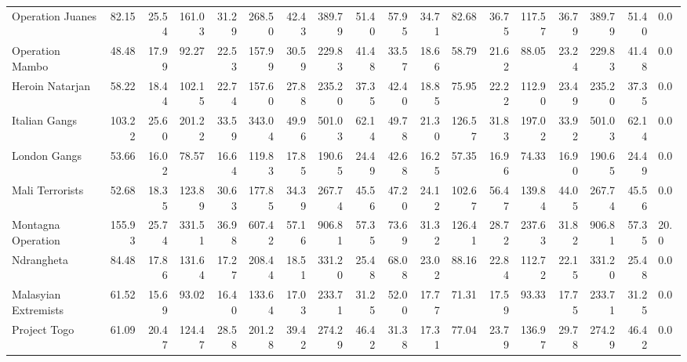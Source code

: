 \begin{tabular}{lrrrrrrrrrrrrrrrrl}
Operation Juanes     &             82.15 &  25.54 &  161.03 &  31.29 &  268.50 &  42.43 &  389.79 &  51.40 &            57.95 &   34.71 &   82.68 &   36.75 &  117.57 &   36.79 &  389.79 &  51.40 &        0.0 \\
Operation Mambo      &             48.48 &  17.99 &   92.27 &  22.53 &  157.99 &  30.59 &  229.83 &  41.48 &            33.57 &   18.66 &   58.79 &   21.62 &   88.05 &   23.24 &  229.83 &  41.48 &        0.0 \\
Heroin Natarjan      &             58.22 &  18.44 &  102.15 &  22.74 &  157.60 &  27.88 &  235.20 &  37.35 &            42.40 &   18.85 &   75.95 &   22.22 &  112.90 &   23.49 &  235.20 &  37.35 &        0.0 \\
Italian Gangs        &            103.22 &  25.60 &  201.22 &  33.59 &  343.04 &  49.96 &  501.03 &  62.14 &            49.78 &   21.30 &  126.57 &   31.83 &  197.02 &   33.92 &  501.03 &  62.14 &        0.0 \\
London Gangs         &             53.66 &  16.02 &   78.57 &  16.64 &  119.83 &  17.85 &  190.65 &  24.49 &            42.68 &   16.25 &   57.35 &   16.96 &   74.33 &   16.90 &  190.65 &  24.49 &        0.0 \\
Mali Terrorists      &             52.68 &  18.35 &  123.89 &  30.63 &  177.85 &  34.39 &  267.74 &  45.56 &            47.20 &   24.12 &  102.67 &   56.47 &  139.84 &   44.05 &  267.74 &  45.56 &        0.0 \\
Montagna Operation   &            155.93 &  25.74 &  331.51 &  36.98 &  607.42 &  57.16 &  906.81 &  57.35 &            73.69 &   31.32 &  126.41 &   28.72 &  237.63 &   31.82 &  906.81 &  57.35 &       20.0 \\
Ndrangheta           &             84.48 &  17.86 &  131.64 &  17.27 &  208.44 &  18.51 &  331.20 &  25.48 &            68.08 &   23.02 &   88.16 &   22.84 &  112.72 &   22.15 &  331.20 &  25.48 &        0.0 \\
Malasyian Extremists &             61.52 &  15.69 &   93.02 &  16.40 &  133.64 &  17.03 &  233.71 &  31.25 &            52.00 &   17.77 &   71.31 &   17.59 &   93.33 &   17.75 &  233.71 &  31.25 &        0.0 \\
Project Togo         &             61.09 &  20.47 &  124.47 &  28.58 &  201.28 &  39.42 &  274.29 &  46.42 &            31.38 &   17.31 &   77.04 &   23.79 &  136.97 &   29.78 &  274.29 &  46.42 &        0.0 \\
\bottomrule
\end{tabular}
